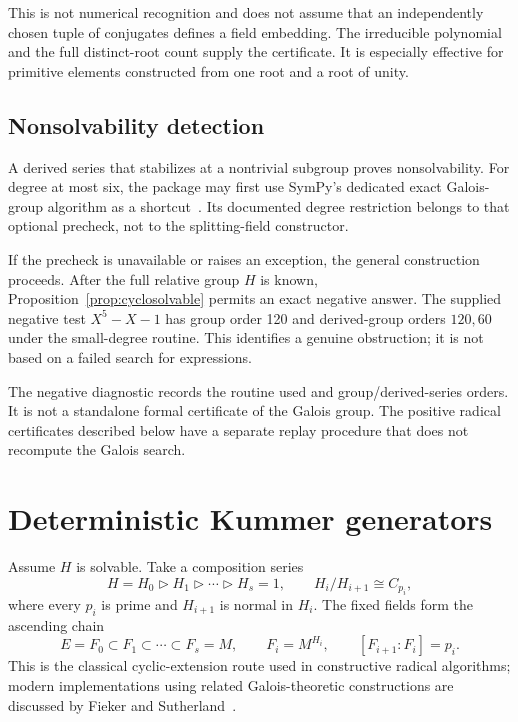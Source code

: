 \documentclass[11pt,a4paper]{article}
\theoremstyle{definition}
\theoremstyle{remark}
\begin{document}
This is not numerical recognition and does not assume that an independently chosen tuple of conjugates defines a field embedding. The irreducible polynomial and the full distinct-root count supply the certificate. It is especially effective for primitive elements constructed from one root and a root of unity.

\subsection{Nonsolvability detection}

A derived series that stabilizes at a nontrivial subgroup proves nonsolvability. For degree at most six, the package may first use SymPy's dedicated exact Galois-group algorithm as a shortcut~\cite{sympynumberfields}. Its documented degree restriction belongs to that optional precheck, not to the splitting-field constructor.

If the precheck is unavailable or raises an exception, the general construction proceeds. After the full relative group $H$ is known, Proposition~\ref{prop:cyclosolvable} permits an exact negative answer. The supplied negative test $X^5-X-1$ has group order 120 and derived-group orders $120,60$ under the small-degree routine. This identifies a genuine obstruction; it is not based on a failed search for expressions.

The negative diagnostic records the routine used and group/derived-series orders. It is not a standalone formal certificate of the Galois group. The positive radical certificates described below have a separate replay procedure that does not recompute the Galois search.

\section{Deterministic Kummer generators}\label{sec:kummer}

Assume $H$ is solvable. Take a composition series
\begin{equation}
 H=H_0\triangleright H_1\triangleright\cdots\triangleright H_s=1,
 \qquad H_i/H_{i+1}\cong C_{p_i},
 \label{eq:composition}
\end{equation}
where every $p_i$ is prime and $H_{i+1}$ is normal in $H_i$. The fixed fields form the ascending chain
\begin{equation}
 E=F_0\subset F_1\subset\cdots\subset F_s=M,
 \qquad F_i=M^{H_i},\qquad [F_{i+1}:F_i]=p_i.
 \label{eq:fixedfields}
\end{equation}
This is the classical cyclic-extension route used in constructive radical algorithms; modern implementations using related Galois-theoretic constructions are discussed by Fieker and Sutherland~\cite{fieker}.
\end{document}
